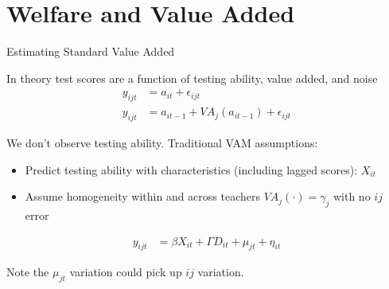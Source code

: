 \documentclass[t,aspectratio=169,11pt]{beamer}
\newenvironment{wideitemize}{\itemize\addtolength{\itemsep}{14pt}}{\enditemize}
\begin{document}
\section{Welfare and Value Added}


\begin{frame}{Estimating Standard  Value Added}

\begin{wideitemize}
    \item In theory test scores are a function of testing ability, value added, and noise
    \begin{align*}
    y_{ijt}  &= a_{it} + \epsilon_{ijt} \\
    y_{ijt}  &= a_{it-1} + VA_j(a_{it-1}) + \epsilon_{ijt}
    \end{align*}
 
    \item We don't observe testing ability. Traditional VAM assumptions:
    \begin{itemize}
        \item Predict testing ability with characteristics (including lagged scores): $X_{it}$
        \item Assume homogeneity within and across teachers $VA_j(\cdot)=\gamma_j$ with no $ij$ error
    \end{itemize}
    \begin{align*}
    y_{ijt}  &= \beta X_{it} +\Gamma D_{it} +\mu_{jt} + \eta_{it}
    \end{align*}
    
    \item Note the $\mu_{jt}$ variation could pick up $ij$ variation.
       
    
\end{wideitemize}
\end{frame}
\end{document}
